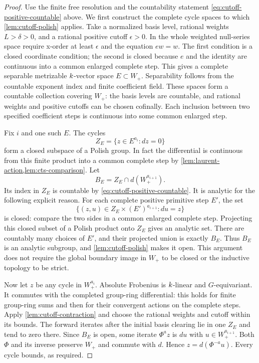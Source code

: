 \begin{proof}
Use the finite free resolution and the countability statement
\cref{eq:cutoff-positive-countable} above. We first construct the
complete cycle spaces to which \cref{lem:cutoff-polish} applies.
Take a normalized basis level, rational
weights $L>\delta>0$, and a rational positive cutoff
$\epsilon>0$.  In the whole weighted null-series space require
x-order at least $\epsilon$ and the equation $ew=w$.  The first
condition is a closed coordinate condition; the second is closed
because $e$ and the identity are continuous into a common enlarged
complete step.  This gives a complete separable metrizable
$k$-vector space $E\subset W_+$.  Separability follows from the
countable exponent index and finite coefficient field.  These
spaces form a countable collection covering $W_+$: the basis levels
are countable, and rational weights and positive cutoffs can be
chosen cofinally.  Each inclusion between two specified coefficient
steps is continuous into some common enlarged step.

Fix $i$ and one such $E$.  The cycles
\[
 Z_E=\{z\in E^{a_i}: dz=0\}
\]
form a closed subspace of a Polish group.  In fact the differential
is continuous from this finite product into a common complete step
by \cref{lem:laurent-action,lem:cts-comparison}.  Let
\[
 B_E=Z_E\cap d(W_+^{a_{i+1}}).
\]
Its index in $Z_E$ is countable by
\cref{eq:cutoff-positive-countable}.  It is analytic for the
following explicit reason.  For each complete positive primitive
step $E'$, the set
\[
 \{(z,u)\in Z_E\times(E')^{a_{i+1}}:du=z\}
\]
is closed: compare the two sides in a common enlarged complete
step.  Projecting this closed subset of a Polish product onto
$Z_E$ gives an analytic set.  There are countably many choices of
$E'$, and their projected union is exactly $B_E$.  Thus $B_E$ is
an analytic subgroup, and \cref{lem:cutoff-polish} makes it open.
This argument does not require the global boundary image in $W_+$
to be closed or the inductive topology to be strict.

Now let $z$ be any cycle in $W_+^{a_i}$.  Absolute Frobenius is
$k$-linear and $G$-equivariant.  It commutes with the completed
group-ring differential: this holds for finite group-ring sums and
then for their convergent actions on the complete steps.  Apply
\cref{lem:cutoff-contraction} and choose the rational weights and
cutoff within its bounds.  The forward iterates after the initial
basis clearing lie in one $Z_E$ and tend to zero there.  Since
$B_E$ is open, some iterate $\Phi^a z$ is $du$ with
$u\in W_+^{a_{i+1}}$.  Both $\Phi$ and its inverse preserve $W_+$
and commute with $d$.  Hence $z=d(\Phi^{-a}u)$.  Every cycle
bounds, as required.
\end{proof}

